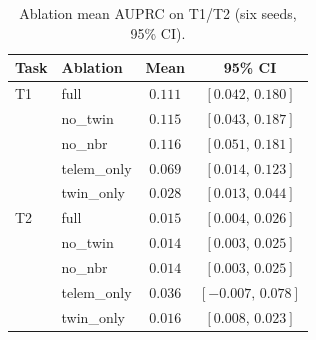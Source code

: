 \begin{table}[!t]
\centering
\caption{Ablation mean AUPRC on T1/T2 (six seeds, 95\% CI).}
\label{tab:ablation}
\renewcommand{\arraystretch}{1.1}
\setlength{\tabcolsep}{3.5pt}
{\footnotesize\begin{tabular}{llcc}
\toprule
Task & Ablation & Mean & 95\% CI \\
\midrule
T1 & full & $0.111$ & $[0.042,\,0.180]$ \\
 & no\_twin & $0.115$ & $[0.043,\,0.187]$ \\
 & no\_nbr & $0.116$ & $[0.051,\,0.181]$ \\
 & telem\_only & $0.069$ & $[0.014,\,0.123]$ \\
 & twin\_only & $0.028$ & $[0.013,\,0.044]$ \\
T2 & full & $0.015$ & $[0.004,\,0.026]$ \\
 & no\_twin & $0.014$ & $[0.003,\,0.025]$ \\
 & no\_nbr & $0.014$ & $[0.003,\,0.025]$ \\
 & telem\_only & $0.036$ & $[-0.007,\,0.078]$ \\
 & twin\_only & $0.016$ & $[0.008,\,0.023]$ \\
\bottomrule
\end{tabular}}
\end{table}
